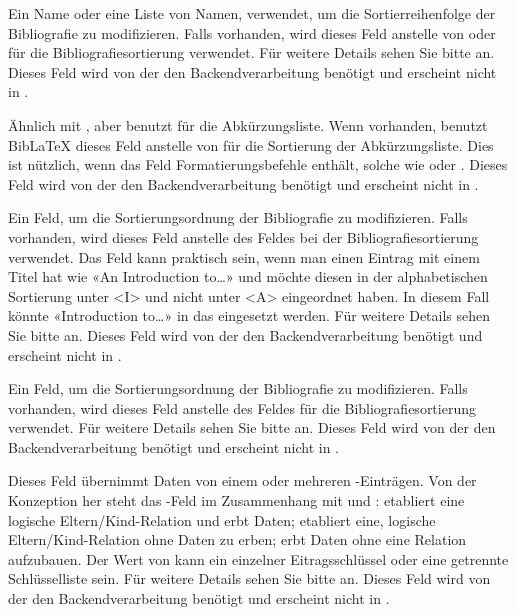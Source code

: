 \documentclass{ltxdockit}[2011/03/25]
\newcommand*{\biblatex}{BibLaTeX\xspace}
\begin{document}
\begin{fieldlist}

Ein Name oder eine Liste von Namen, verwendet, um die Sortierreihenfolge der Bibliografie zu modifizieren. Falls vorhanden, wird dieses Feld anstelle von    oder  für die Bibliografiesortierung verwendet. 
Für weitere Details sehen Sie bitte   an. Dieses Feld wird von der
den Backendverarbeitung benötigt und erscheint nicht in .


Ähnlich mit , aber benutzt für die Abkürzungsliste. 
Wenn vorhanden, benutzt \biblatex dieses Feld anstelle von 
 für die Sortierung der Abkürzungsliste. Dies ist nützlich, wenn
das Feld   Formatierungsbefehle enthält, solche wie  oder . Dieses Feld wird von der
den Backendverarbeitung benötigt und erscheint nicht in . 


Ein Feld, um die Sortierungsordnung der Bibliografie zu modifizieren.
Falls vorhanden, wird dieses Feld anstelle des Feldes  bei der
Bibliografiesortierung verwendet. Das Feld  kann praktisch sein, wenn man einen Eintrag mit einem Titel hat wie «An Introduction to\dots» und 
möchte diesen in der alphabetischen Sortierung unter  <I> und nicht unter  <A> eingeordnet haben. In 
diesem Fall könnte «Introduction to\dots» in das  eingesetzt werden. Für weitere Details sehen Sie bitte  an.
Dieses Feld wird von der
den Backendverarbeitung benötigt und erscheint nicht in . 


Ein Feld, um die Sortierungsordnung der Bibliografie zu modifizieren.
Falls vorhanden, wird dieses Feld anstelle des Feldes  für die Bibliografiesortierung verwendet.  Für weitere Details sehen Sie bitte
 an. Dieses Feld wird von der
den Backendverarbeitung benötigt und erscheint nicht in . 


Dieses Feld übernimmt Daten von einem oder mehreren -Einträgen. 
Von der Konzeption her steht das -Feld im Zusammenhang mit   und :  etabliert eine
logische Eltern/Kind-Relation und erbt Daten;  etabliert eine,
logische Eltern/Kind-Relation ohne Daten zu erben;  erbt Daten
ohne eine Relation aufzubauen. Der Wert von   kann ein einzelner
Eitragsschlüssel oder eine getrennte Schlüsselliste sein.
Für weitere Details sehen Sie bitte  an. 
Dieses Feld wird von der
den Backendverarbeitung benötigt und erscheint nicht in .


\end{fieldlist}
\end{document}
